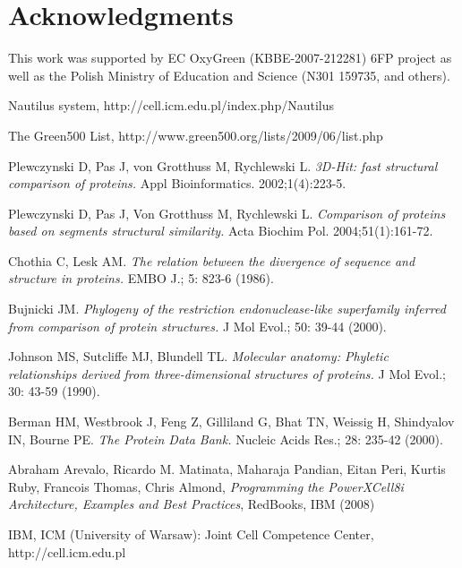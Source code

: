 \section{Acknowledgments}
This work was supported by EC OxyGreen (KBBE-2007-212281) 6FP project as
well as the Polish Ministry of Education and Science (N301 159735,
and others).

\begin{thebibliography}{99}

 Nautilus system,
http://cell.icm.edu.pl/index.php/Nautilus

 The Green500 List,
http://www.green500.org/lists/2009/06/list.php

 Plewczynski D, Pas J, von Grotthuss M, Rychlewski L.
\textit{3D-Hit: fast structural comparison of proteins.}
Appl Bioinformatics. 2002;1(4):223-5.

  Plewczynski D, Pas J, Von Grotthuss M, Rychlewski L.
\textit{Comparison of proteins based on segments structural similarity.}
Acta Biochim Pol. 2004;51(1):161-72.

 Chothia C, Lesk AM. \textit{The relation between the
divergence of sequence and structure in proteins.} EMBO J.; 5: 823-6 (1986).

 Bujnicki JM. \textit{Phylogeny of the restriction
endonuclease-like superfamily inferred from comparison of protein structures.}
J Mol Evol.; 50: 39-44 (2000).

 Johnson MS, Sutcliffe MJ, Blundell TL. \textit{Molecular
anatomy: Phyletic relationships derived from three-dimensional structures of
proteins.} J Mol Evol.; 30: 43-59 (1990).

 Berman HM, Westbrook J, Feng Z, Gilliland G, Bhat TN,
Weissig H, Shindyalov IN, Bourne PE. \textit{The Protein Data Bank.}
Nucleic Acids Res.; 28: 235-42 (2000).

 Abraham Arevalo, Ricardo M. Matinata, Maharaja Pandian,
Eitan Peri, Kurtis Ruby, Francois Thomas, Chris Almond,
\textit{Programming the PowerXCell8i Architecture, Examples and Best Practices},
RedBooks, IBM (2008)

 IBM, ICM (University of Warsaw):
Joint Cell Competence Center, http://cell.icm.edu.pl




\end{thebibliography}


